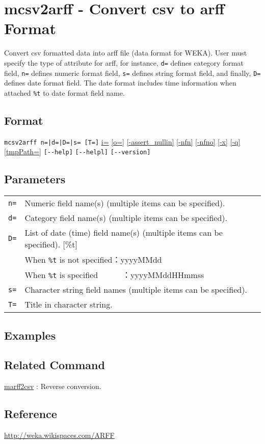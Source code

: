 
%

\section{mcsv2arff - Convert csv to arff Format\label{sect:mcsv2arff}}
Convert csv formatted data into arff file (data format for WEKA). 
User must specify the type of attribute for arff, for instance, \verb|d=| defines category format field, \verb|n=| defines numeric format field, \verb|s=| defines string format field, and finally, \verb|D=| defines date format field. The date format includes time information when attached \verb|%t| to date format field name.

\subsection*{Format}
\verb/mcsv2arff n=|d=|D=|s= [T=]/
\hyperref[sect:option_i]{i=}
\hyperref[sect:option_o]{[o=]}
\hyperref[sect:option_assert_nullin]{[-assert\_nullin]}
\hyperref[sect:option_nfn]{[-nfn]}
\hyperref[sect:option_nfno]{[-nfno]}
\hyperref[sect:option_x]{[-x]}
\hyperref[sect:option_q]{[-q]}
\hyperref[sect:option_option_tmppath]{[tmpPath=]}
\verb|[--help]|
\verb|[--helpl]|
\verb|[--version]|\\

\subsection*{Parameters}
\begin{table}[htbp]
{\small
\begin{tabular}{ll}
\verb|n=|    & Numeric field name(s) (multiple items can be specified).\\
\verb|d=|    & Category field name(s) (multiple items can be specified).\\
\verb|D=|    & List of date (time) field name(s) (multiple items can be specified).  [\%{t}]\\
             & When \verb|%t| is not specified：yyyyMMdd\\
             & When \verb|%t| is specified　　　：yyyyMMddHHmmss\\
\verb|s=|    & Character string field names (multiple items can be specified).\\
\verb|T=|    & Title in character string. \\
\end{tabular} 
}
\end{table} 


\subsection*{Examples}

\subsection*{Related Command}

\hyperref[sect:marff2csv]{marff2csv} : Reverse conversion. 

\subsection*{Reference}
\href{http://weka.wikispaces.com/ARFF}{http://weka.wikispaces.com/ARFF}

%
